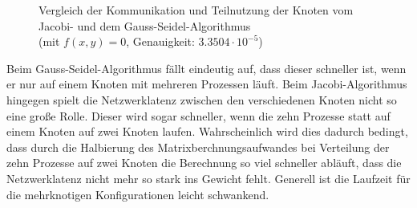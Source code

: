 \documentclass[a4paper,12pt]{scrartcl}
\begin{document}
\begin{figure}[htb]
  \centering
  \caption{Vergleich der Kommunikation und Teilnutzung der Knoten vom Jacobi- und dem Gauss-Seidel-Algorithmus\\
  (mit $f(x,y) = 0$, Genauigkeit: $3.3504 \cdot 10^{-5}$)}
  \label{weakPlot}
\end{figure}

Beim Gauss-Seidel-Algorithmus fällt eindeutig auf, dass dieser schneller ist,
wenn er nur auf einem Knoten mit mehreren Prozessen läuft.
Beim Jacobi-Algorithmus hingegen spielt die Netzwerklatenz zwischen den verschiedenen Knoten
nicht so eine große Rolle. Dieser wird sogar schneller, wenn die zehn Prozesse statt auf einem Knoten auf zwei Knoten laufen. Wahrscheinlich wird dies dadurch bedingt, dass durch die Halbierung des Matrixberchnungsaufwandes bei Verteilung der zehn Prozesse auf zwei Knoten die Berechnung so viel schneller abläuft, dass die Netzwerklatenz nicht mehr so stark ins Gewicht fehlt.
Generell ist die Laufzeit für die mehrknotigen Konfigurationen leicht schwankend.
\end{document}
